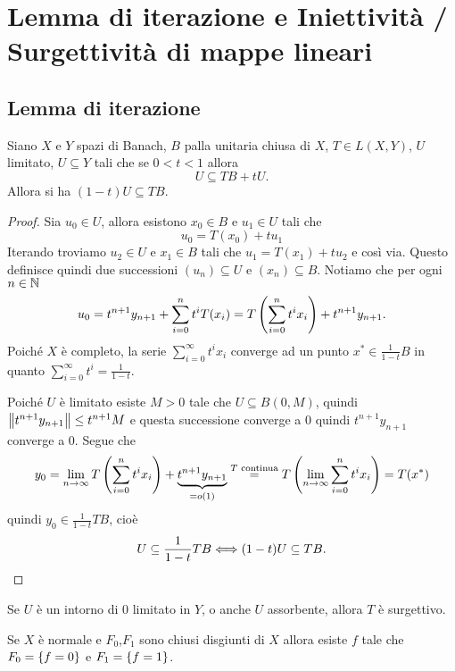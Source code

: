 \chapter{Lemma di iterazione e Iniettivit\`a / Surgettivit\`a di mappe lineari}



\section{Lemma di iterazione}

\begin{lemma}[di iterazione]\label{LmDiIterazione}
Siano $X$ e $Y$ spazi di Banach, $B$ palla unitaria chiusa di $X$, $T\in L(X,Y)$, $U$ limitato, $U\subseteq Y$ tali che se $0<t<1$ allora
\[U\subseteq TB+tU.\]
Allora si ha $(1-t)U\subseteq TB$.
\end{lemma}
\begin{proof}
Sia $u_0\in U$, allora esistono $x_0\in B$ e $u_1\in U$ tali che 
\[u_0=T(x_0)+tu_1\]
Iterando troviamo $u_2\in U$ e $x_1\in B$ tali che $u_1=T(x_1)+tu_2$ e cos\`i via. Questo definisce quindi due successioni $(u_n)\subseteq U$ e $(x_n)\subseteq B$. Notiamo che per ogni $n\in\N$
\[u_0=t^{n+1}y_{n+1}+\sum_{i=0}^nt^iT(x_i)=T\pa{\sum_{i=0}^nt^ix_i}+t^{n+1}y_{n+1}.\]
Poich\'e $X$ \`e completo, la serie $\sum_{i=0}^\infty t^i x_i$ converge ad un punto $x^\ast\in \frac1{1-t}B$ in quanto $\sum_{i=0}^\infty t^i=\frac1{1-t}$.

Poich\'e $U$ \`e limitato esiste $M>0$ tale che $U\subseteq B(0,M)$, quindi $\norm{t^{n+1} y_{n+1}}\leq t^{n+1}M$ e questa successione converge a $0$ quindi $t^{n+1} y_{n+1}$ converge a $0$. Segue che
\[y_0=\lim_{n\to\infty} T\pa{\sum_{i=0}^nt^i x_i}+\under{=o(1)}{t^{n+1}y_{n+1}}\pasgnl={$T$ continua}T\pa{\lim_{n\to\infty}\sum_{i=0}^nt^ix_i}=T(x^\ast)\]
quindi $y_0\in \frac1{1-t}T B$, cio\`e
\[U\subseteq \frac1{1-t}TB\coimplies (1-t)U\subseteq TB.\]
\end{proof}

\begin{remark}
Se $U$ \`e un intorno di $0$ limitato in $Y$, o anche $U$ assorbente, allora $T$ \`e surgettivo.
\end{remark}

\begin{theorem}\label{ThLemmaUrysohn}
Se $X$ \`e normale e $F_0$,$F_1$ sono chiusi disgiunti di $X$ allora esiste $f$ tale che $F_0=\cpa{f=0}$ e $F_1=\cpa{f=1}$.
\end{theorem}

